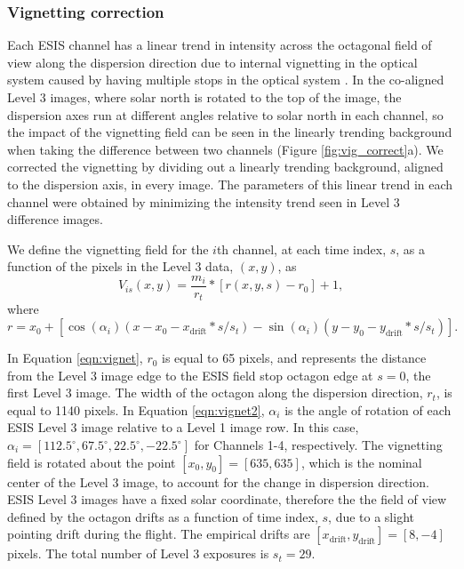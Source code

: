 \subsubsection{Vignetting correction}
  
Each ESIS channel has a linear trend in intensity across the octagonal field of view along the dispersion direction due to internal vignetting in the optical system caused by having multiple stops in the optical system \citep{ESIS}.
In the co-aligned Level 3 images, where solar north is rotated to the top of the image, the dispersion axes run at different angles relative to solar north in each channel, so the impact of the vignetting field can be seen in the linearly trending background when taking the difference between two channels (Figure \ref{fig:vig_correct}a).
We corrected the vignetting by dividing out a linearly trending background, aligned to the dispersion axis, in every image. The parameters of this linear trend in each channel were obtained by minimizing the intensity trend seen in Level 3 difference images.

We define the vignetting field for the $i$th channel, at each time index, $s$, as a function of the pixels in the Level 3 data, $(x,y)$, as 
	\begin{equation}
		V_{is}(x,y) = \frac{m_i}{r_t} * [r(x,y,s) - r_0] + 1,
		\label{eqn:vignet}
	\end{equation}
where
	\begin{equation}
		r = x_0 + [\cos(\alpha_i)(x-x_0-x_{\text{drift}}*s/s_t) - \sin(\alpha_i)(y-y_0-y_{\text{drift}}*s/s_t)].
		\label{eqn:vignet2}
	\end{equation}

In Equation \ref{eqn:vignet}, $r_0$ is equal to 65 pixels, and represents the distance from the Level 3 image edge to the ESIS field stop octagon edge at $s = 0$, the first Level 3 image.
The width of the octagon along the dispersion direction, $r_t$, is equal to 1140 pixels.
In Equation \ref{eqn:vignet2},  $\alpha_i$ is the angle of rotation of each ESIS Level 3 image relative to a Level 1 image row.
In this case, $\alpha_i = [112.5^{\circ}, 67.5^{\circ}, 22.5^{\circ}, -22.5^{\circ}]$ for Channels 1-4, respectively.
The vignetting field is rotated about the point $[x_0, y_0] = [635,635]$, which is the nominal center of the Level 3 image, to account for the change in dispersion direction.
ESIS Level 3 images have a fixed solar coordinate, therefore the the field of view defined by the octagon drifts as a function of time index, $s$, due to a slight pointing drift during the flight. 
The empirical drifts are $[x_{\text{drift}},y_{\text{drift}}] = [8, -4]$ pixels. 
The total number of Level 3 exposures is $s_t=29$. 


